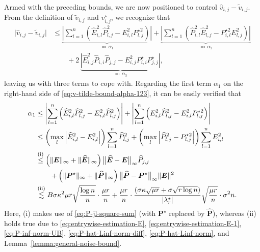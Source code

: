 Armed with the preceding bounds, we are now positioned to control $\widehat{v}_{i,j} - \widetilde{v}_{i,j}$. From the definition of $\widetilde{v}_{i,j}$ and $v_{i,j}^{\star}$, we recognize that
%
\begin{align}
\big| \widehat{v}_{i,j} - \widetilde{v}_{i,j} \big| & \leq\underset{\eqqcolon\,\alpha_{1}}{\underbrace{\left|\sum_{l=1}^{n}\left(\widehat{E}_{i,l}^{2}\widehat{P}_{l,j}^{2}-E_{i,l}^{2}P_{l,j}^{\star 2}\right)\right|}}+\underset{\eqqcolon\,\alpha_{2}}{\underbrace{\left|\sum_{l=1}^{n}\left(\widehat{P}_{i,l}^{2}\widehat{E}_{l,j}^{2}-P_{i,l}^{\star 2}E_{l,j}^{2}\right)\right|}}\nonumber \\
 & \qquad+2\, \underset{\eqqcolon\,\alpha_{3}}{\underbrace{\left|\widehat{E}_{i,j}^{2}\widehat{P}_{i,i}\widehat{P}_{j,j}-E_{i,j}^{2}P_{i,i}^\star P_{j,j}^\star \right|}},
	\label{eq:v-tilde-bound-alpha-123}
\end{align}
%
leaving us with three terms to cope with. 
Regarding the first term $\alpha_1$ on the right-hand side of \eqref{eq:v-tilde-bound-alpha-123}, it can be easily verified that
%
\begin{align}
\alpha_{1} & \leq
\left|\sum_{l=1}^{n}\left(\widehat{E}_{i,l}^{2}\widehat{P}_{l,j}^{2}-E_{i,l}^{2}\widehat{P}_{l,j}^{2}\right)\right|+\left|\sum_{l=1}^{n}\left(E_{i,l}^{2}\widehat{P}_{l,j}^{2}-E_{i,l}^{2}P_{l,j}^{\star2}\right)\right| \notag\\
 & \leq \left(\max_{l}\left|\widehat{E}_{i,l}^{2}-E_{i,l}^{2}\right|\right)\sum_{l=1}^{n}\widehat{P}_{l,j}^{2}+\left(\max_{l}\left| \widehat{P}_{l,j}^{2} - P_{l,j}^{\star 2} \right|\right)\sum_{l=1}^{n}E_{i,l}^{2} \notag\\
	& \overset{\mathrm{(i)}}{\leq} \left(\|\bm{E}\|_{\infty}+\|\widehat{\bm{E}}\|_{\infty}\right)\big\|\widehat{\bm{E}}-\bm{E}\big\|_{\infty}\widehat{P}_{j,j} \notag\\
	&\qquad +\left(\|\bm{P}^\star \|_{\infty}+\|\widehat{\bm{P}}\|_{\infty}\right)\big\|\widehat{\bm{P}}-\bm{P}^\star \big\|_{\infty}\|\bm{E}\|^{2} \notag\\
	& \overset{\mathrm{(ii)}}{\lesssim} B\sigma\kappa^{2}\mu r\sqrt{\frac{\log n}{n}}\cdot\frac{\mu r}{n}+\frac{\mu r}{n}\cdot\frac{(\sigma\kappa\sqrt{\mu r}+\sigma\sqrt{r\log n})}{|\lambda_{r}^{\star}|}\sqrt{\frac{\mu r}{n}}\cdot\sigma^{2}n.  \notag
\end{align}
%
Here, (i) makes use of \eqref{eq:P-jl-square-sum} (with $\bm{P}^{\star}$ replaced by $\widehat{\bm{P}}$), 
whereas (ii) holds true due to \eqref{eq:entrywise-estimation-E}, \eqref{eq:entrywise-estimation-E-1}, \eqref{eq:P-inf-norm-UB}, \eqref{eq:P-hat-Linf-norm-diff}, \eqref{eq:P-hat-Linf-norm}, and Lemma~\ref{lemma:general-noise-bound}.  
